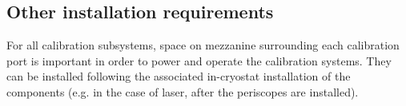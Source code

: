 \subsection{Other installation requirements} 
For all calibration subsystems, space on mezzanine surrounding each calibration port is important in order to power and operate the calibration systems. They can be installed following the associated in-cryostat installation of the components (e.g. in the case of laser, after the periscopes are installed).

\begin{comment}
\subsection{Installation}
Only the laser system alternative design has components that need to installed inside the cryostat via the TCO. The pulsed neutron source and radioactive source deployment systems are installed only using the cryostat roof ports.

Laser, inside TCO: A long horizontal track system is to be installed outside the end-wall field cage, directly below the corresponding calibration ports, and suspended by them. The system farthest away from the TCO must be installed before TPC (FC/APA/CPA) installation begins. This installation requires the simultaneous installation of the corresponding periscopes, from the calibration ports, so that the two systems can be properly connected. The relevant QC is essentially alignment test.

In addition, the alternative laser positioning system has sets of photo-diodes pre-mounted on the HV system bottom ground planes. The only step that needs to be done inside the TCO is connecting the cabling to available flange (still working out how to route cables and which flange to use).



Laser, outside TCO: The periscopes on the top of the TPC in the center can be installed after the relevant structural elements (e.g. field cage), these proceed in sequence with the assembly of other components (furthest from TCO is assembled first) and alignments can be done as elements are installed with the alignment laser system. Once for each periscope/laser system, prior to the installation of further TPC components, we will need to clear the cavern to align the UV (Class 4) and visible lasers this will need special safety precautions. It may be possible to do this special alignment operation for all lasers at roughly the same time, to minimize the disruption.  


\end{comment}
